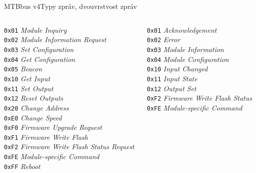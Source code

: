 \documentclass[aspectratio=169]{beamer}
\begin{document}
\begin{frame}{MTBbus v4}{Typy zpráv, dvouvrstvost zpráv}
\footnotesize
\begin{columns}
	\begin{column}{.45\textwidth}
		\texttt{0x01} \textit{Module Inquiry} \\
		\texttt{0x02} \textit{Module Information Request} \\
		\texttt{0x03} \textit{Set Configuration} \\
		\texttt{0x04} \textit{Get Configuration} \\
		\texttt{0x05} \textit{Beacon} \\
		\texttt{0x10} \textit{Get Input} \\
		\texttt{0x11} \textit{Set Output} \\
		\texttt{0x12} \textit{Reset Outputs} \\
		\texttt{0x20} \textit{Change Address} \\
		\texttt{0xE0} \textit{Change Speed} \\
		\texttt{0xF0} \textit{Firmware Upgrade Request} \\
		\texttt{0xF1} \textit{Firmware Write Flash} \\
		\texttt{0xF2} \textit{Firmware Write Flash Status Request} \\
		\texttt{0xFE} \textit{Module-specific Command} \\
		\texttt{0xFF} \textit{Reboot}
	\end{column}
	\begin{column}{.45\textwidth}
		\texttt{0x01} \textit{Acknowledgement} \\
		\texttt{0x02} \textit{Error} \\
		\texttt{0x03} \textit{Module Information} \\
		\texttt{0x04} \textit{Module Configuration} \\
		\texttt{0x10} \textit{Input Changed} \\
		\texttt{0x11} \textit{Input State} \\
		\texttt{0x12} \textit{Output Set} \\
		\texttt{0xF2} \textit{Firmware Write Flash Status} \\
		\texttt{0xFE} \textit{Module-specific Command}
	\end{column}
\end{columns}
\end{frame}

\end{document}
